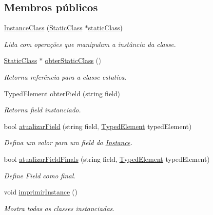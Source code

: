 \subsection*{Membros públicos}
\begin{DoxyCompactItemize}
\item 
\hyperlink{classInstanceClass_ac1bee1eb9725e1fec8de7f4cf97f369c}{Instance\+Class} (\hyperlink{classStaticClass}{Static\+Class} $\ast$\hyperlink{classInstanceClass_a45804f1afe3666a4b4511cf8e3f1013b}{static\+Class})
\begin{DoxyCompactList}\small\item\em Lida com operações que manipulam a instância da classe. \end{DoxyCompactList}\item 
\hyperlink{classStaticClass}{Static\+Class} $\ast$ \hyperlink{classInstanceClass_a6da567a64a8373d609792821f5acb9a3}{obter\+Static\+Class} ()
\begin{DoxyCompactList}\small\item\em Retorna referência para a classe estatica. \end{DoxyCompactList}\item 
\hyperlink{BasicTypes_8h_a97b332303b1262282599e6ede0637b82}{Typed\+Element} \hyperlink{classInstanceClass_a98084eb37c43d680169298bc50f09c98}{obter\+Field} (string field)
\begin{DoxyCompactList}\small\item\em Retorna field instanciado. \end{DoxyCompactList}\item 
bool \hyperlink{classInstanceClass_a3af2fc7bfe8f406b5ea6efbf18161514}{atualizar\+Field} (string field, \hyperlink{BasicTypes_8h_a97b332303b1262282599e6ede0637b82}{Typed\+Element} typed\+Element)
\begin{DoxyCompactList}\small\item\em Defina um valor para um field da \hyperlink{classInstance}{Instance}. \end{DoxyCompactList}\item 
bool \hyperlink{classInstanceClass_a05a47d4bf656908ce3dacc53d9d791b2}{atualizar\+Field\+Finals} (string field, \hyperlink{BasicTypes_8h_a97b332303b1262282599e6ede0637b82}{Typed\+Element} typed\+Element)
\begin{DoxyCompactList}\small\item\em Define Field como final. \end{DoxyCompactList}\item 
void \hyperlink{classInstanceClass_a9790b6bb982d58a0bbddcb8c9ba358d4}{imprimir\+Instance} ()
\begin{DoxyCompactList}\small\item\em Mostra todas as classes instanciadas. \end{DoxyCompactList}\end{DoxyCompactItemize}
